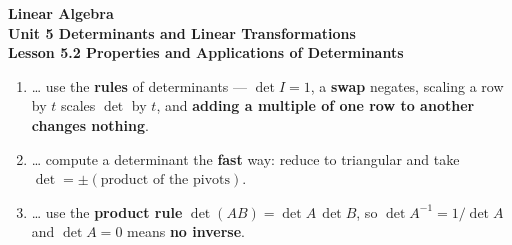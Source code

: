 \documentclass[10pt]{article}
\begin{document}
\vspace{-0.8in}

\begin{center}
  {\color{white}\textbf{\LARGE Linear Algebra}}\\[4pt]
  {\color{blushmid}\large\textbf{Unit 5 \quad Determinants and Linear Transformations}}\\[6pt]
  {\color{white}\textbf{\large Lesson 5.2 \quad Properties and Applications of Determinants}}
\end{center}

\vspace{0.22in}
\namedateperiod
\vspace{0.18in}

\begin{learningtargetbox}
\small
\begin{enumerate}[leftmargin=1.5em, itemsep=5pt]
  \item \ldots{} use the \textbf{rules} of determinants --- $\det I=1$, a \textbf{swap} negates, scaling a row by $t$ scales $\det$ by $t$, and \textbf{adding a multiple of one row to another changes nothing}.
  \item \ldots{} compute a determinant the \textbf{fast} way: reduce to triangular and take $\det=\pm(\text{product of the pivots})$.
  \item \ldots{} use the \textbf{product rule} $\det(AB)=\det A\,\det B$, so $\det A^{-1}=1/\det A$ and $\det A=0$ means \textbf{no inverse}.
\end{enumerate}
\end{learningtargetbox}

\vspace{0.14in}
\end{document}
